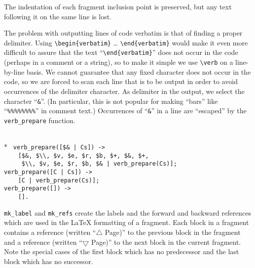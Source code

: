 The indentation of each fragment inclusion point is preserved, but any
text following it on the same line is lost.

The problem with outputting lines of code verbatim is that of finding a
proper delimiter. Using \verb+\begin{verbatim}+ \ldots{}
\verb+\end{verbatim}+ would make it even more difficult to assure that
the text ``\verb+\end{verbatim}+'' does not occur in the code (perhaps
in a comment or a string), so to make it simple we use \verb+\verb+ on a
line-by-line basis. We cannot guarantee that any fixed character does
not occur in the code, so we are forced to scan each line that is to be
output in order to avoid occurrences of the delimiter character. As
delimiter in the output, we select the character ``\verb+&+''. (In
particular, this is not popular for making ``bars'' like
``\verb+%%%%%%%%+'' in comment text.) Occurrences of ``\verb+&+'' in a
line are ``escaped'' by the \verb+verb_prepare+ function.

\begin{flushleft}
\label{eweave_10_14}
\\*
\tt
\noindent{}%
\verb&verb_prepare([$&\verb+&+\verb& | Cs]) ->&\\
\noindent{}%
\verb&    [$&\verb+&+\verb&, $\\, $v, $e, $r, $b, $+, $&\verb+&+\verb&, $+,&\\
\noindent{}%
\verb&     $\\, $v, $e, $r, $b, $&\verb+&+\verb& | verb_prepare(Cs)];&\\
\noindent{}%
\verb&verb_prepare([C | Cs]) ->&\\
\noindent{}%
\verb&    [C | verb_prepare(Cs)];&\\
\noindent{}%
\verb&verb_prepare([]) ->&\\
\noindent{}%
\verb&    [].&\\
\end{flushleft}

  \verb+mk_label+ and \verb+mk_refs+ create the labels and the forward
and backward references which are used in the \LaTeX{} formatting of a
fragment. Each block in a fragment contains a reference (written
``$\bigtriangleup$ Page)'' to the previous block in the fragment and a
reference (written ``$\bigtriangledown$ Page)'' to the next block in the
current fragment. Note the special cases of the first block which has no
predecessor and the last block which has no successor.

